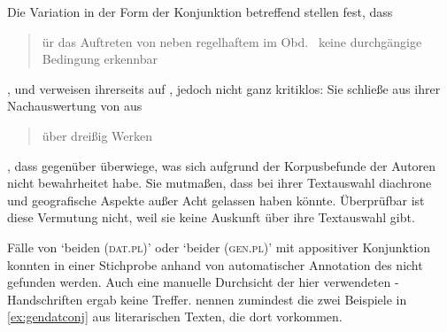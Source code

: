 Die Variation in der Form der Konjunktion betreffend stellen \citet[628]{ksw2}
fest, dass \blockquote{ür das Auftreten von  neben
regelhaftem  im Obd.\ \textelp{} keine durchgängige Bedingung
erkennbar }, und verweisen ihrerseits auf \citet{gjelsten1980},
jedoch nicht ganz kritiklos: Sie schließe aus ihrer Nachauswertung von
 aus
\blockcquote[198]{gjelsten1980}{über dreißig Werken}, dass 
gegenüber  überwiege, was sich aufgrund der Korpusbefunde der
Autoren nicht bewahrheitet habe. Sie mutmaßen, dass \citeauthor{gjelsten1980}
bei ihrer Textauswahl diachrone und geografische Aspekte außer Acht gelassen
haben könnte. Überprüfbar ist diese Vermutung nicht, weil sie keine Auskunft
über ihre Textauswahl gibt.

Fälle von  `beiden (\textsc{dat.pl})' oder 
`beider (\textsc{gen.pl})' mit appositiver Konjunktion konnten in einer
Stichprobe anhand von  automatischer Annotation des
\CAO{} nicht gefunden werden. Auch eine manuelle Durchsicht der hier
verwendeten \KC{}-Handschriften ergab keine Treffer. \citet[626]{ksw2}
nennen zumindest die zwei Beispiele in \cref{ex:gendatconj} aus literarischen
Texten, die dort  vorkommen.

